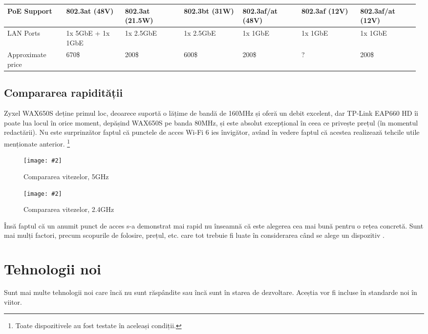 \documentclass[a4paper,12pt]{report}
\def\oldchapter{} \let\oldchapter=\chapter{}
\def\chapter{\stepcounter{num_chapters}\oldchapter}
\newcommand{\centeredImageWithCaption}[2]{%
  \begin{figure}[H]
    \caption{#1}
    \texttt{[image: \#2]}
    \centering
  \end{figure}}
\begin{document}
\begin{table}[!ht]
\begin{tabular}{*{7}{|p{0.14\linewidth}}|}
      \hline
      PoE Support &
      802.3at (48V) &
      802.3at (21.5W) &
      802.3bt (31W) &
      802.3af/at (48V) &
      802.3af (12V) &
      802.3af/at (12V) \\

      \hline
      LAN Ports &
      1x 5GbE + 1x 1GbE &
      1x 2.5GbE &
      1x 2.5GbE &
      1x 1GbE &
      1x 1GbE &
      1x 1GbE \\

      \hline
      Approximate price &
      670\$ &
      200\$ &
      600\$ &
      200\$ &
      {?} &
      200\$ \\

      \hline
  \end{tabular}
\end{table}



\section{Compararea rapidității}

\cite{standards_ieee802_11_timeline}

Zyxel WAX650S deține primul loc, deoarece suportă o lățime de bandă de 160MHz și oferă un debit excelent, dar TP-Link E\ac{AP}660 HD îi poate lua locul în orice moment, depășind WAX650S pe banda 80MHz, și este absolut excepțional în ceea ce privește prețul (în momentul redactării).
Nu este surprinzător faptul că punctele de acces \ac{Wi-Fi} 6 ies învigător, având în vedere faptul că acestea realizează tehcile utile menționate anterior. \footnote{Toate dispozitivele au fost testate în aceleași condiții.}

\centeredImageWithCaption{Compararea vitezelor, 5GHz}{best-wireless-access-points-1-re-new.jpg}

\centeredImageWithCaption{Compararea vitezelor, 2.4GHz}{best-wireless-access-points-2-re-new.jpg}


Însă faptul că un anumit punct de acces s-a demonstrat mai rapid nu înseamnă că este alegerea cea mai bună pentru o rețea concretă. Sunt mai mulți factori, precum scopurile de folosire, prețul, etc. care tot trebuie fi luate în considerarea când se alege un dispozitiv \cite{AP_comparison}.


\chapter{Tehnologii noi}

Sunt mai multe tehnologii noi care încă nu sunt răspândite sau încă sunt în starea de dezvoltare.
Aceștia vor fi incluse în standarde noi în viitor.
\end{document}
